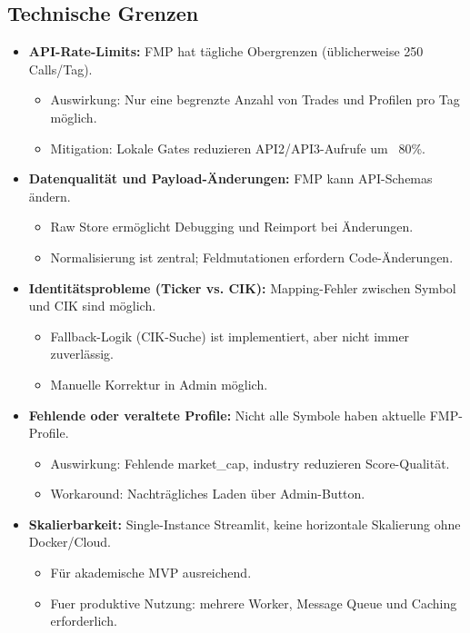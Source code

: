 \subsection{Technische Grenzen}
\begin{itemize}
  \item \textbf{API-Rate-Limits:} FMP hat tägliche Obergrenzen (üblicherweise 250 Calls/Tag). %
    \begin{itemize}
      \item Auswirkung: Nur eine begrenzte Anzahl von Trades und Profilen pro Tag möglich.
      \item Mitigation: Lokale Gates reduzieren API2/API3-Aufrufe um ~80\%. %
    \end{itemize}
  \item \textbf{Datenqualität und Payload-Änderungen:} FMP kann API-Schemas ändern. %
    \begin{itemize}
      \item Raw Store ermöglicht Debugging und Reimport bei Änderungen.
      \item Normalisierung ist zentral; Feldmutationen erfordern Code-Änderungen.
    \end{itemize}
  \item \textbf{Identitätsprobleme (Ticker vs. CIK):} Mapping-Fehler zwischen Symbol und CIK sind möglich. %
    \begin{itemize}
      \item Fallback-Logik (CIK-Suche) ist implementiert, aber nicht immer zuverlässig.
      \item Manuelle Korrektur in Admin möglich.
    \end{itemize}
  \item \textbf{Fehlende oder veraltete Profile:} Nicht alle Symbole haben aktuelle FMP-Profile. %
    \begin{itemize}
      \item Auswirkung: Fehlende market\_cap, industry reduzieren Score-Qualität.
      \item Workaround: Nachträgliches Laden über Admin-Button.
    \end{itemize}
  \item \textbf{Skalierbarkeit:} Single-Instance Streamlit, keine horizontale Skalierung ohne Docker/Cloud. %
    \begin{itemize}
      \item Für akademische MVP ausreichend.
      \item Fuer produktive Nutzung: mehrere Worker, Message Queue und Caching erforderlich.
    \end{itemize}
\end{itemize}

